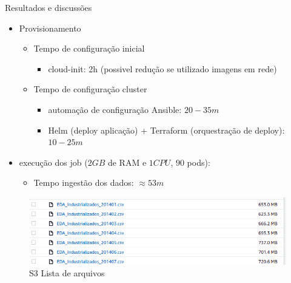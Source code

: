 \documentclass[10pt,brazil]{beamer}
\theoremstyle{definition}
\begin{document}
\begin{frame}{Resultados e discussões}
  \begin{itemize}
    \item Provisionamento
    \begin{itemize}
      \item Tempo de configuração inicial
      \begin{itemize}
        \item cloud-init: 2h (possivel redução  se utilizado imagens em rede)
      \end{itemize}
    \end{itemize}
    \begin{itemize}
      \item Tempo de configuração cluster
        \begin{itemize}
          \item automação de configuração Ansible: $20-35m$
          \item Helm (deploy aplicação) + Terraform (orquestração de deploy): $10-25m$
        \end{itemize}
    \end{itemize}
    \item execução dos job ($2GB$ de RAM e $1CPU$, $90$ pods):
    \begin{itemize}
        \item Tempo ingestão dos dados: $\approx 53m$ 
    \end{itemize}
  \end{itemize}
\end{frame}


\begin{frame}[plain]
  \hspace*{-10mm}
  \begin{figure}
    \centering  
  \includegraphics[width=.75\paperwidth]{s3_size.png}
      \caption{S3 Lista de arquivos}
  \end{figure}  
\end{frame}
\end{document}
